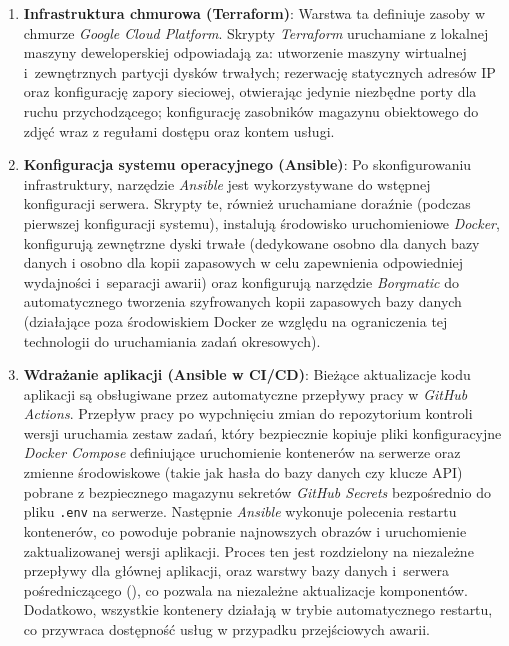 \begin{enumerate}
    \item \textbf{Infrastruktura chmurowa (Terraform)}: Warstwa ta definiuje zasoby w chmurze \textit{Google Cloud Platform}. Skrypty \textit{Terraform} uruchamiane z lokalnej maszyny deweloperskiej odpowiadają za: utworzenie maszyny wirtualnej i~zewnętrznych partycji dysków trwałych; rezerwację statycznych adresów IP oraz konfigurację zapory sieciowej, otwierając jedynie niezbędne porty dla ruchu przychodzącego; konfigurację zasobników magazynu obiektowego do zdjęć wraz z regułami dostępu oraz kontem usługi.
    
    \item \textbf{Konfiguracja systemu operacyjnego (Ansible)}: Po skonfigurowaniu infrastruktury, narzędzie \textit{Ansible} jest wykorzystywane do wstępnej konfiguracji serwera. Skrypty te, również uruchamiane doraźnie (podczas pierwszej konfiguracji systemu), instalują środowisko uruchomieniowe \textit{Docker}, konfigurują zewnętrzne dyski trwałe (dedykowane osobno dla danych bazy danych i osobno dla kopii zapasowych w celu zapewnienia odpowiedniej wydajności i~separacji awarii) oraz konfigurują narzędzie \textit{Borgmatic} \cite{borgmatic} do automatycznego tworzenia szyfrowanych kopii zapasowych bazy danych (działające poza środowiskiem Docker ze względu na ograniczenia tej technologii do uruchamiania zadań okresowych).
    
    \item \textbf{Wdrażanie aplikacji (Ansible w CI/CD)}: Bieżące aktualizacje kodu aplikacji są obsługiwane przez automatyczne przepływy pracy w \textit{GitHub Actions}. Przepływ pracy po wypchnięciu zmian do repozytorium kontroli wersji uruchamia zestaw zadań, który bezpiecznie kopiuje pliki konfiguracyjne \textit{Docker Compose} definiujące uruchomienie kontenerów na serwerze oraz zmienne środowiskowe (takie jak hasła do bazy danych czy klucze API) pobrane z bezpiecznego magazynu sekretów \textit{GitHub Secrets} bezpośrednio do pliku \texttt{.env} na serwerze. Następnie \textit{Ansible} wykonuje polecenia restartu kontenerów, co powoduje pobranie najnowszych obrazów i uruchomienie zaktualizowanej wersji aplikacji. Proces ten jest rozdzielony na niezależne przepływy dla głównej aplikacji,  oraz warstwy bazy danych i~serwera pośredniczącego (), co pozwala na niezależne aktualizacje komponentów. Dodatkowo, wszystkie kontenery działają w trybie automatycznego restartu, co przywraca dostępność usług w przypadku przejściowych awarii.
\end{enumerate}

